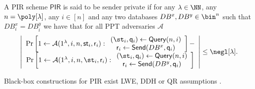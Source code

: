 \begin{definition}
A PIR scheme $\mathsf{PIR}$ is said to be sender private if for any $\lambda\in\NN$, any $n=\poly[\lambda]$, any $i\in[n]$ and any two databases $DB^x,DB^y\in\bin^n$ such that $DB_i^x=DB_i^y$ we have that for all PPT adversaries $\mathcal{A}$
\begin{equation*}
\left| \begin{array}{c}
     \Pr\left[1\gets\mathcal{A}(1^\lambda,i,n,\mathsf{st}_{i},\mathsf{r}_{i}):\begin{array}{c}
          (\st_i,\quer_i)\gets\query(n,i)  \\
          \resp_i\gets\send(DB^x,\quer_i)
     \end{array}\right] -  \\
      \Pr\left[1\gets\mathcal{A}(1^\lambda,i,n,\st_i,\resp_i):\begin{array}{c}
           (\st_i,\quer_i)\gets\query(n,i)  \\
          \resp_i\gets\send(DB^y,\quer_i) 
      \end{array}\right]
\end{array}\right |\le \negl[\lambda].
\end{equation*}
\end{definition}

Black-box constructions for PIR exist LWE, DDH or QR  assumptions \cite{C:DGIMMO19}.


